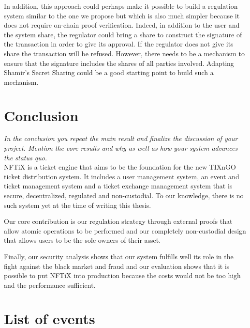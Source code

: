 \documentclass[a4paper,11pt,oneside]{report}
\begin{document}
In addition, this approach could perhaps make it possible to build a regulation system similar to the one we propose but which is also much simpler because it does not require on-chain proof verification. Indeed, in addition to the user and the system share, the regulator could bring a share to construct the signature of the transaction in order to give its approval. If the regulator does not give its share the transaction will be refused. However, there needs to be a mechanism to ensure that the signature includes the shares of all parties involved. Adapting Shamir's Secret Sharing could be a good starting point to build such a mechanism.

\chapter{Conclusion}

\textit{In the conclusion you repeat the main result and finalize the discussion of
your project. Mention the core results and why as well as how your system
advances the status quo.} \\

NFTiX is a ticket engine that aims to be the foundation for the new TIXnGO ticket distribution system. It includes a user management system, an event and ticket management system and a ticket exchange management system that is secure, decentralized, regulated and non-custodial. To our knowledge, there is no such system yet at the time of writing this thesis.

Our core contribution is our regulation strategy through external proofs that allow atomic operations to be performed and our completely non-custodial design that allows users to be the sole owners of their asset.

Finally, our security analysis shows that our system fulfills well its role in the fight against the black market and fraud and our evaluation shows that it is possible to put NFTiX into production because the costs would not be too high and the performance sufficient.


\cleardoublepage
{}
{}
\nocite{*}
\printbibliography

\appendix
\chapter{List of events}
\label{sec:appendix_a}
\end{document}
